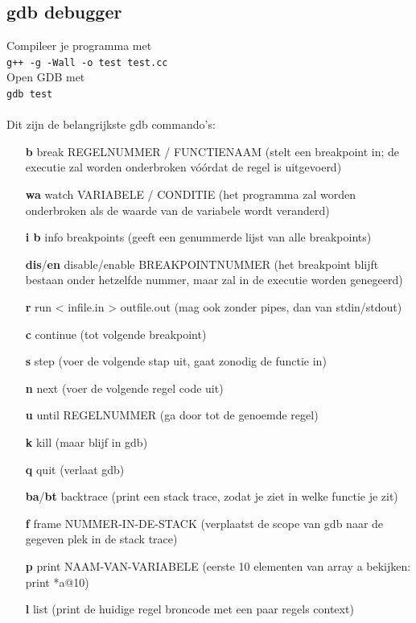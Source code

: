 \documentclass[10pt,a4paper,titlepage]{article}
\begin{document}
\subsection{gdb debugger}
Compileer je programma met\\ \texttt{g++ -g -Wall -o test test.cc}\\Open GDB met\\\texttt{gdb test}
~\\~\\
Dit zijn de belangrijkste gdb commando's:
\begin{itemize}[noitemsep,nolistsep]
\item[\textbf{b}]
break REGELNUMMER / FUNCTIENAAM (stelt een breakpoint in; de executie zal worden
                                 onderbroken vóórdat de regel is uitgevoerd)
\item[\textbf{wa}] watch VARIABELE / CONDITIE   (het programma zal worden onderbroken als de waarde
                              van de variabele wordt veranderd)
\item[\textbf{i b}] info breakpoints           (geeft een genummerde lijst van alle breakpoints)
\item[\textbf{dis}/\textbf{en}] disable/enable BREAKPOINTNUMMER  (het breakpoint blijft bestaan onder hetzelfde
                                 nummer, maar zal in de executie worden genegeerd)

\item[\textbf{r}] run < infile.in > outfile.out   (mag ook zonder pipes, dan van stdin/stdout)
\item[\textbf{c}] continue   (tot volgende breakpoint)
\item[\textbf{s}] step   (voer de volgende stap uit, gaat zonodig de functie in)
\item[\textbf{n}] next   (voer de volgende regel code uit)
\item[\textbf{u}] until REGELNUMMER   (ga door tot de genoemde regel)
\item[\textbf{k}] kill   (maar blijf in gdb)
\item[\textbf{q}] quit   (verlaat gdb)

\item[\textbf{ba}/\textbf{bt}] backtrace   (print een stack trace, zodat je ziet in welke functie je zit)
\item[\textbf{f}] frame NUMMER-IN-DE-STACK   (verplaatst de scope van gdb naar de gegeven plek in de stack trace)
\item[\textbf{p}] print NAAM-VAN-VARIABELE   (eerste 10 elementen van array a bekijken: print *a@10)
\item[\textbf{l}] list   (print de huidige regel broncode met een paar regels context)
\end{itemize}
\end{document}
